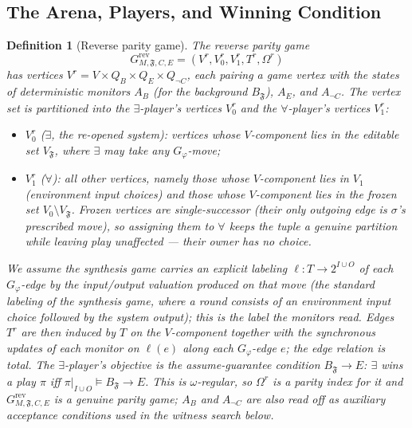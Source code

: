\documentclass[11pt]{article}
\newtheorem{definition}{Definition}
\theoremstyle{remark}
\newcommand{\Frame}{\mathfrak{F}}
\begin{document}
\subsection{The Arena, Players, and Winning Condition}

\begin{definition}[Reverse parity game]
\label{def:rpg}
The reverse parity game
\[
  G^{\mathrm{rev}}_{M,\Frame,C,E}
  =(V^{r},V^{r}_{0},V^{r}_{1},T^{r},\Omega^{r})
\]
has vertices \(V^{r}=V\times Q_B\times Q_E\times Q_{\neg C}\), each pairing a game
vertex with the states of deterministic monitors \(A_B\) (for the background
\(B_{\Frame}\)), \(A_E\), and \(A_{\neg C}\). The vertex set is \emph{partitioned}
into the \(\exists\)-player's vertices \(V^{r}_{0}\) and the \(\forall\)-player's
vertices \(V^{r}_{1}\):
\begin{itemize}
  \item \(V^{r}_{0}\) (\(\exists\), the re-opened system): vertices whose
        \(V\)-component lies in the editable set \(V_{\Frame}\), where \(\exists\)
        may take any \(G_\varphi\)-move;
  \item \(V^{r}_{1}\) (\(\forall\)): all other vertices, namely those whose
        \(V\)-component lies in \(V_1\) (environment input choices) \emph{and}
        those whose \(V\)-component lies in the frozen set
        \(V_0\setminus V_{\Frame}\). Frozen vertices are \emph{single-successor}
        (their only outgoing edge is \(\sigma\)'s prescribed move), so assigning
        them to \(\forall\) keeps the tuple a genuine partition while leaving
        play unaffected --- their owner has no choice.
\end{itemize}
We assume the synthesis game carries an explicit \emph{labeling}
\(\ell:T\to 2^{I\cup O}\) of each \(G_\varphi\)-edge by the input/output valuation
produced on that move (the standard labeling of the synthesis game, where a
round consists of an environment input choice followed by the system output);
this is the label the monitors read. Edges \(T^{r}\) are then induced by \(T\) on
the \(V\)-component together with the synchronous updates of each monitor on
\(\ell(e)\) along each \(G_\varphi\)-edge \(e\); the edge relation is total. The
\(\exists\)-player's \emph{objective} is the assume-guarantee condition
\(B_{\Frame}\rightarrow E\): \(\exists\) wins a play \(\pi\) iff
\(\pi|_{I\cup O}\models B_{\Frame}\rightarrow E\). This is \(\omega\)-regular, so
\(\Omega^{r}\) is a parity index for it and \(G^{\mathrm{rev}}_{M,\Frame,C,E}\) is
a genuine parity game; \(A_B\) and \(A_{\neg C}\) are also read off as
\emph{auxiliary} acceptance conditions used in the witness search below.
\end{definition}
\end{document}
